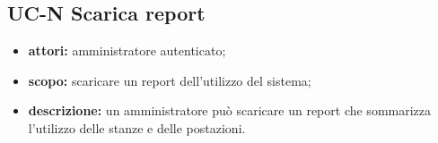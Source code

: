 \subsection{UC-N Scarica report}
\begin{itemize}
    \item \textbf{attori:} amministratore autenticato;
    \item \textbf{scopo:} scaricare un report dell'utilizzo del sistema;
    \item \textbf{descrizione:} un amministratore pu\`{o} scaricare un report che sommarizza l'utilizzo delle stanze e delle postazioni.
\end{itemize}
